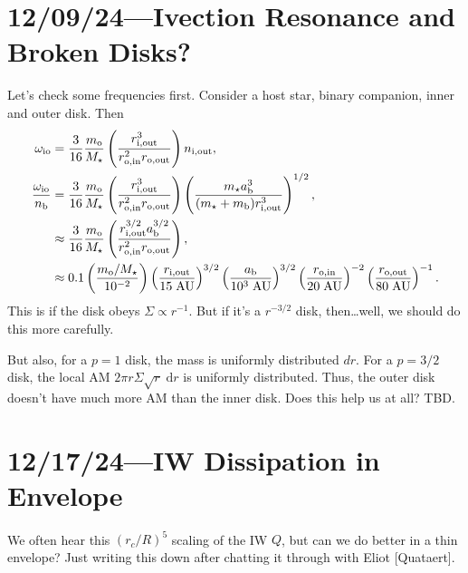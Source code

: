 \documentclass[12pt]{article}
\newcommand*{\p}[1]{\left(#1\right)}
\begin{document}
\section{12/09/24---Ivection Resonance and Broken Disks?}

Let's check some frequencies first. Consider a host star, binary companion,
inner and outer disk. Then
\begin{align}
    \omega_{\rm io}
        &= \frac{3}{16}\frac{m_{\rm o}}{M_\star}
            \p{\frac{r_{\rm i,out}^3}{r_{\rm o, in}^2r_{\rm o,out}}}
            n_{\rm i,out},\\
    \frac{\omega_{\rm io}}{n_{\rm b}}
        &= \frac{3}{16}\frac{m_{\rm o}}{M_\star}
            \p{\frac{r_{\rm i,out}^3}{r_{\rm o, in}^2r_{\rm o,out}}}
            \p{\frac{m_\star a_{\rm b}^3}{(m_\star + m_{\rm b})r_{\rm
            i,out}^3}}^{1/2}
                ,\\
        &\approx
            \frac{3}{16}
            \frac{m_{\rm o}}{M_\star}
            \p{\frac{r_{\rm i,out}^{3/2}a_{\rm b}^{3/2}}
                {r_{\rm o, in}^2r_{\rm o,out}}},\\
        &\approx
            0.1
            \p{\frac{m_{\rm o} / M_\star}{10^{-2}}}
            \p{\frac{r_{\rm i,out}}{15\;\mathrm{AU}}}^{3/2}
            \p{\frac{a_{\rm b}}{10^3\;\mathrm{AU}}}^{3/2}
            \p{\frac{r_{\rm o, in}}{20\;\mathrm{AU}}}^{-2}
            \p{\frac{r_{\rm o, out}}{80\;\mathrm{AU}}}^{-1}.
\end{align}
This is if the disk obeys $\Sigma \propto r^{-1}$. But if it's a $r^{-3/2}$
disk, then\dots well, we should do this more carefully.

But also, for a $p=1$ disk, the mass is uniformly distributed $dr$. For a
$p=3/2$ disk, the local AM $2\pi r \Sigma \sqrt{r}\;\mathrm{d}r$ is uniformly
distributed.
Thus, the outer disk doesn't have much more AM than the inner disk.
Does this help us at all? TBD\@.

\section{12/17/24---IW Dissipation in Envelope}

We often hear this $(r_c/R)^5$ scaling of the IW $Q$, but can we do better in a
thin envelope? Just writing this down after chatting it through with Eliot
[Quataert].
\end{document}
